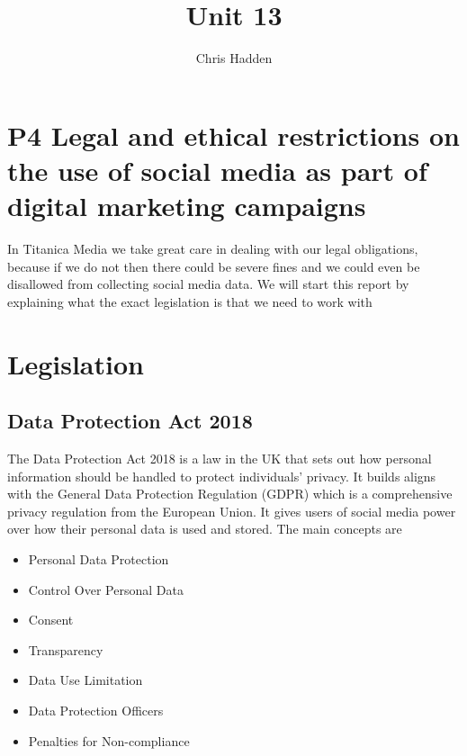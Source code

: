 \documentclass{article}
\begin{document}
\title{Unit 13}
\author{Chris Hadden}
\date{}
\maketitle

\section{P4 Legal and ethical restrictions on the use of social media as part of
digital marketing campaigns}

In Titanica Media we take great care in dealing with our legal obligations, because if we do not then there could be severe fines and we could even be disallowed from collecting social media data.
We will start this report by explaining what the exact legislation is that we need to work with

\section{Legislation}
\subsection{Data Protection Act 2018}
The Data Protection Act 2018 is a law in the UK that sets out how personal information should be handled to protect individuals' privacy. 
It builds aligns with the General Data Protection Regulation (GDPR) which is a comprehensive privacy regulation from the European Union.
It gives users of social media power over how their personal data is used and stored. 
The main concepts are
\begin{itemize}
    \item Personal Data Protection
    \item Control Over Personal Data
    \item Consent
    \item Transparency
    \item Data Use Limitation
    \item Data Protection Officers
    \item Penalties for Non-compliance
\end{itemize}

\bigskip
\end{document}
